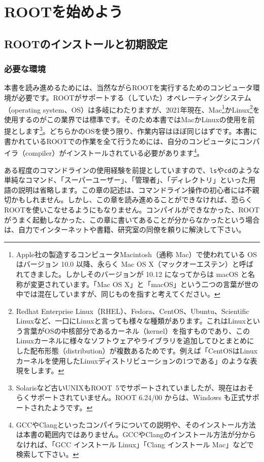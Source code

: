 \chapter{ROOTを始めよう}
\label{chap:Install}
\section{ROOTのインストールと初期設定}
\label{sec:ROOT_install}
\subsection{必要な環境}
本書を読み進めるためには、当然ながらROOTを実行するためのコンピュータ環境が必要です。ROOTがサポートする（していた）オペレーティングシステム（operating system、OS）は多岐にわたりますが、2021年現在、Mac\footnote{Apple社の製造するコンピュータMacintosh（通称 Mac）で使われている OS はバージョン 10.0 以降、永らく Mac OS X（マックオーエステン）と呼ばれてきました。しかしそのバージョンが 10.12 になってからは macOS と名称が変更されています。「Mac OS X」と「macOS」という二つの言葉が世の中では混在していますが、同じものを指すと考えてください。}かLinux\footnote{Redhat Enterprise Linux（RHEL）、Fedora、CentOS、Ubuntu、Scientific Linuxなど、一口にLinuxと言っても様々な種類があります。これはLinuxという言葉がOSの中核部分であるカーネル（kernel）を指すものであり、このLinuxカーネルに様々なソフトウェアやライブラリを追加してひとまとめにした配布形態（distribution）が複数あるためです。例えば「CentOSはLinuxカーネルを使用したLinuxディストリビューションの1つである」のような表現をします。}を使用するのがこの業界では標準です。そのため本書ではMacかLinuxの使用を前提とします\footnote{Solarisなど古いUNIXもROOT~5でサポートされていましたが、現在はおそらくサポートされていません。ROOT 6.24/00 からは、Windows も正式サポートされたようです。}。どちらかのOSを使う限り、作業内容はほぼ同じはずです。本書に書かれているROOTでの作業を全て行うためには、自分のコンピュータにコンパイラ（compiler）がインストールされている必要があります\footnote{GCCやClangといったコンパイラについての説明や、そのインストール方法は本書の範囲内ではありません。GCCやClangのインストール方法が分からなければ、「GCC インストール Linux」「Clang インストール Mac」などで検索して下さい。}。

ある程度のコマンドラインの使用経験を前提としていますので、\texttt{ls}や\texttt{cd}のような単純なコマンド、「スーパーユーザー」、「管理者」、「ディレクトリ」といった用語の説明は省略します。この章の記述は、コマンドライン操作の初心者には不親切かもしれません。しかし、この章を読み進めることができなければ、恐らくROOTを使いこなせるようにもなりません。コンパイルができなかった、ROOTがうまく起動しなかった、この章に書いてあることが分からなかったという場合は、自力でインターネットや書籍、研究室の同僚を頼りに解決して下さい。

